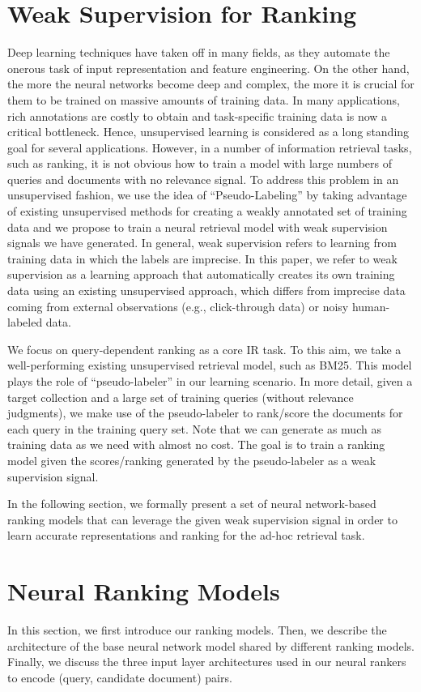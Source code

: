 \documentclass[sigconf]{acmart}
\newcommand{\sshrink}{\vspace{-.80ex}}
\begin{document}
\sshrink
\section{Weak Supervision for Ranking}
Deep learning techniques have taken off in many fields, as they automate the onerous task of input representation and feature engineering. 
On the other hand, the more the neural networks become deep and complex, the more it is crucial for them to be trained on massive amounts of training data.
In many applications, rich annotations are costly to obtain and task-specific training data is now a critical bottleneck. 
%
Hence, unsupervised learning is considered as a long standing goal for several applications. However, in a number of information retrieval tasks, such as ranking, it is not obvious how to train a model with large numbers of queries and documents with no relevance signal.
%
To address this problem in an unsupervised fashion, we use the idea of ``Pseudo-Labeling'' by taking advantage of existing unsupervised methods for creating a weakly annotated set of training data and we propose to train a neural retrieval model with weak supervision signals we have generated.
In general, weak supervision refers to learning from training data in which the labels are imprecise. In this paper, we refer to weak supervision as a learning approach that automatically creates its own training data using an existing unsupervised approach, which differs from imprecise data coming from external observations (e.g., click-through data) or noisy human-labeled data.

We focus on query-dependent ranking as a core IR task. To this aim, we take a well-performing existing unsupervised retrieval model, such as BM25. This model plays the role of ``pseudo-labeler'' in our learning scenario. In more detail, given a target collection and a large set of training queries (without relevance judgments), we make use of the pseudo-labeler to rank/score the documents for each query in the training query set.  Note that we can generate as much as training data as we need with almost no cost. The goal is to train a ranking model given the scores/ranking generated by the pseudo-labeler as a weak supervision signal. 
 
In the following section, we formally present a set of neural network-based ranking models that can leverage the given weak supervision signal in order to learn accurate representations and ranking for the ad-hoc retrieval task.

\sshrink
\section{Neural Ranking Models}
In this section, we first introduce our ranking models. Then, we describe the architecture of the base neural network model shared by different ranking models. Finally, we discuss the three input layer architectures used in our neural rankers to encode (query, candidate document) pairs.
\end{document}
